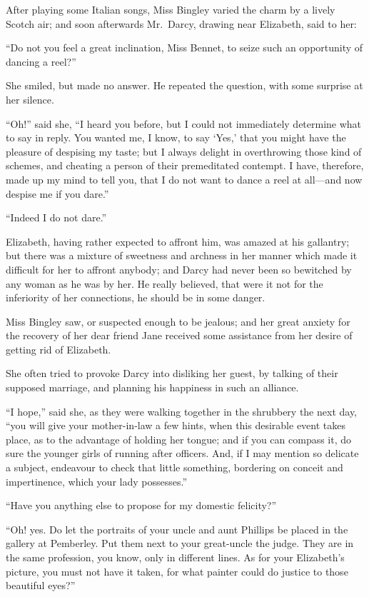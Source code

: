 After playing some Italian songs, Miss Bingley varied the charm
by a lively Scotch air; and soon afterwards Mr.\ Darcy, drawing
near Elizabeth, said to her:

``Do not you feel a great inclination, Miss Bennet, to seize such
an opportunity of dancing a reel?''

She smiled, but made no answer.  He repeated the question, with
some surprise at her silence.

``Oh!'' said she, ``I heard you before, but I could not immediately
determine what to say in reply.  You wanted me, I know, to say
`Yes,' that you might have the pleasure of despising my taste;
but I always delight in overthrowing those kind of schemes,
and cheating a person of their premeditated contempt.  I have,
therefore, made up my mind to tell you, that I do not want to
dance a reel at all---and now despise me if you dare.''

``Indeed I do not dare.''

Elizabeth, having rather expected to affront him, was amazed at
his gallantry; but there was a mixture of sweetness and archness
in her manner which made it difficult for her to affront anybody;
and Darcy had never been so bewitched by any woman as he
was by her.  He really believed, that were it not for the
inferiority of her connections, he should be in some danger.

Miss Bingley saw, or suspected enough to be jealous; and her
great anxiety for the recovery of her dear friend Jane received
some assistance from her desire of getting rid of Elizabeth.

She often tried to provoke Darcy into disliking her guest, by
talking of their supposed marriage, and planning his happiness in
such an alliance.

``I hope,'' said she, as they were walking together in the
shrubbery the next day, ``you will give your mother-in-law a few
hints, when this desirable event takes place, as to the advantage
of holding her tongue; and if you can compass it, do sure the
younger girls of running after officers.  And, if I may mention so
delicate a subject, endeavour to check that little something,
bordering on conceit and impertinence, which your lady
possesses.''

``Have you anything else to propose for my domestic felicity?''

``Oh! yes.  Do let the portraits of your uncle and aunt Phillips be
placed in the gallery at Pemberley.  Put them next to your
great-uncle the judge.  They are in the same profession, you
know, only in different lines.  As for your Elizabeth's picture, you
must not have it taken, for what painter could do justice to those
beautiful eyes?''

